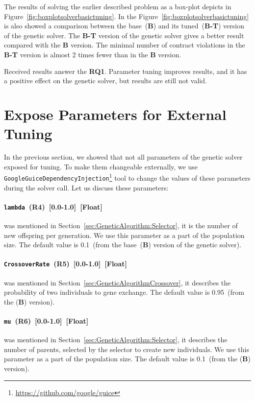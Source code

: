 The results of solving the earlier described problem as a box-plot depicts in Figure~\ref{fig:boxplotsolverbasictuning}. In the Figure~\ref{fig:boxplotsolverbasictuning} is also showed a comparison between the base~(\textbf{B}) and its tuned~(\textbf{B-T}) version of the genetic solver. The \textbf{B-T} version of the genetic solver gives a better result compared with the \textbf{B} version. The minimal number of contract violations in the \textbf{B-T} version is almost 2 times fewer than in the \textbf{B} version. 

Received results answer the \textbf{RQ1}. Parameter tuning improves results, and it has a positive effect on the genetic solver, but results are still not valid. 

\section{Expose Parameters for External Tuning}

In the previous section, we showed that not all parameters of the genetic solver exposed for tuning. To make them changeable externally, we use \texttt{GoogleGuiceDependencyInjection}\footnote{\url{https://github.com/google/guice}} tool to change the values of these parameters during the solver call. Let us discuss these parameters:
\paragraph{\texttt{lambda}~(R4)~[0.0-1.0]~[Float]} was mentioned in Section~\ref{sec:GeneticAlgorithm:Selector}, it is the number of new offspring per generation. We use this parameter as a part of the population size. The default value is 0.1~(from the base~(\textbf{B}) version of the genetic solver).
\paragraph{\texttt{CrossoverRate}~(R5)~[0.0-1.0]~[Float]} was mentioned in Section~\ref{sec:GeneticAlgorithmCrossover}, it describes the probability of two individuals to gene exchange. The default value is 0.95~(from the (\textbf{B}) version).
\paragraph{\texttt{mu}~(R6)~[0.0-1.0]~[Float]} was mentioned in Section~\ref{sec:GeneticAlgorithm:Selector}, it describes the number of parents, selected by the selector to create new individuals. We use this parameter as a part of the population size. The default value is 0.1~(from the (\textbf{B}) version).
